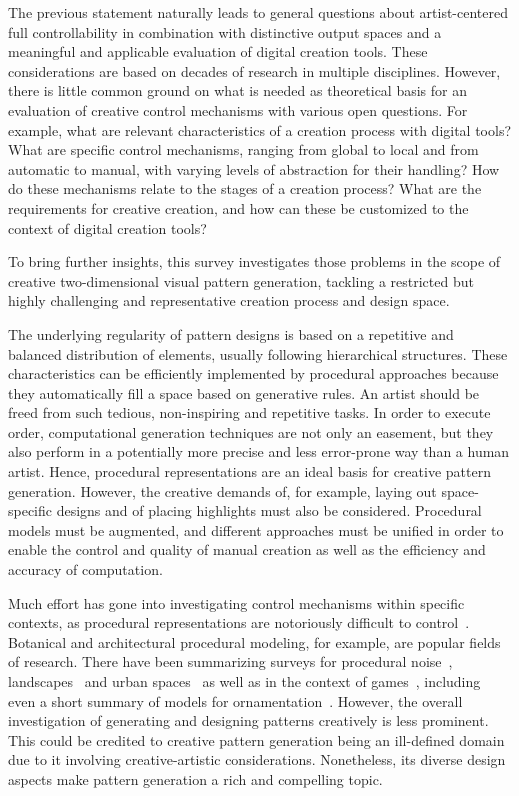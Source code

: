 The previous statement naturally leads to general questions about artist-centered full controllability in combination with distinctive output spaces and a meaningful and applicable evaluation of digital creation tools. These considerations are based on decades of research in multiple disciplines. However, there is little common ground on what is needed as theoretical basis for an evaluation of creative control mechanisms with various open questions. For example, what are relevant characteristics of a creation process with digital tools? What are specific control mechanisms, ranging from global to local and from automatic to manual, with varying levels of abstraction for their handling? How do these mechanisms relate to the stages of a creation process? What are the requirements for creative creation, and how can these be customized to the context of digital creation tools?

To bring further insights, this survey investigates those problems in the scope of creative two-dimensional visual pattern generation, tackling a restricted but highly challenging and representative creation process and design space. 

The underlying regularity of pattern designs is based on a repetitive and balanced distribution of elements, usually following hierarchical structures. These characteristics can be efficiently implemented by procedural approaches \cite{stava_2010_ipm} because they automatically fill a space based on generative rules. An artist should be freed from such tedious, non-inspiring and repetitive tasks. In order to execute order, computational generation techniques are not only an easement, but they also perform in a potentially more precise and less error-prone way than a human artist. Hence, procedural representations are an ideal basis for creative pattern generation. However, the creative demands of, for example, laying out space-specific designs and of placing highlights must also be considered. Procedural models must be augmented, and different approaches must be unified in order to enable the control and quality of manual creation as well as the efficiency and accuracy of computation. 

Much effort has gone into investigating control mechanisms within specific contexts, as procedural representations are notoriously difficult to control~\cite{bourque_2004_ptm,lagae_2010_pis,gilet_2010_ias,benes_2011_gpm,lasram_2012_ssf,lasram_2012_ptp}. Botanical and architectural procedural modeling, for example, are popular fields of research. There have been summarizing surveys for procedural noise~\cite{lagae_2010_sap}, landscapes~\cite{smelik_2014_aso} and urban spaces~\cite{vanegas_2009_mab} as well as in the context of games~\cite{hendrikx_2013_pcg, togelius_2011_sbp}, including even a short summary of models for ornamentation~\cite{whitehead_2010_tpd}. However, the overall investigation of generating and designing patterns creatively is less prominent. This could be credited to creative pattern generation being an ill-defined domain due to it involving creative-artistic considerations. Nonetheless, its diverse design aspects make pattern generation a rich and compelling topic.

